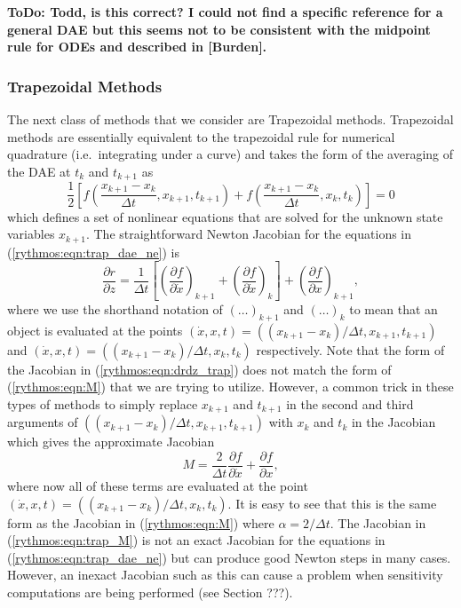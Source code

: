 \documentclass[pdf,ps2pdf,11pt]{SANDreport}
\begin{document}
{}\textbf{ToDo: Todd, is this correct?  I could not find a specific reference
for a general DAE but this seems not to be consistent with the midpoint rule
for ODEs and described in [Burden].}

\subsubsection{Trapezoidal Methods}

The next class of methods that we consider are Trapezoidal methods.
Trapezoidal methods are essentially equivalent to the trapezoidal rule for
numerical quadrature (i.e.\ integrating under a curve) and takes the form of
the averaging of the DAE at $t_k$ and $t_{k+1}$ as
%
\begin{equation}
\frac{1}{2} \left[
f\left( \frac{x_{k+1} - x_{k}}{\Delta t}, x_{k+1} , t_{k+1} \right)
+ f\left( \frac{x_{k+1} - x_{k}}{\Delta t}, x_k , t_k \right)
\right]
 = 0
\label{rythmos:eqn:trap_dae_ne}
\end{equation}
%
which defines a set of nonlinear equations that are solved for the unknown
state variables $x_{k+1}$.  The straightforward Newton Jacobian for the
equations in (\ref{rythmos:eqn:trap_dae_ne}) is
%
\begin{equation}
\frac{\partial r}{\partial z}
= \frac{1}{\Delta t} \left[
\left( \frac{\partial f}{\partial \dot{x}} \right)_{k+1}
+ \left( \frac{\partial f}{\partial \dot{x}} \right)_{k}
\right]
+ \left( \frac{\partial f}{\partial x} \right)_{k+1},
\label{rythmos:eqn:drdz_trap}
\end{equation}
%
where we use the shorthand notation of $(\ldots)_{k+1}$ and $(\ldots)_k$ to
mean that an object is evaluated at the points $(\dot{x},x,t) =
((x_{k+1}-x_k)/\Delta t, x_{k+1}, t_{k+1})$ and $(\dot{x},x,t) =
((x_{k+1}-x_k)/\Delta t, x_k, t_k)$ respectively.  Note that the form of the
Jacobian in (\ref{rythmos:eqn:drdz_trap}) does not match the form of
(\ref{rythmos:eqn:M}) that we are trying to utilize.  However, a common trick
in these types of methods to simply replace $x_{k+1}$ and $t_{k+1}$ in the
second and third arguments of $((x_{k+1}-x_k)/\Delta t, x_{k+1}, t_{k+1})$
with $x_k$ and $t_k$ in the Jacobian which gives the approximate Jacobian
%
\begin{equation}
M
= \frac{2}{\Delta t} \frac{\partial f}{\partial \dot{x}}
+ \frac{\partial f}{\partial x},
\label{rythmos:eqn:trap_M}
\end{equation}
%
where now all of these terms are evaluated at the point $(\dot{x},x,t) =
((x_{k+1}-x_k)/\Delta t, x_k, t_k)$.  It is easy to see that this is the same
form as the Jacobian in (\ref{rythmos:eqn:M}) where $\alpha = 2/\Delta t$.
The Jacobian in (\ref{rythmos:eqn:trap_M}) is not an exact Jacobian for the
equations in (\ref{rythmos:eqn:trap_dae_ne}) but can produce good Newton steps
in many cases.  However, an inexact Jacobian such as this can cause a problem
when sensitivity computations are being performed (see Section ???).
\end{document}
